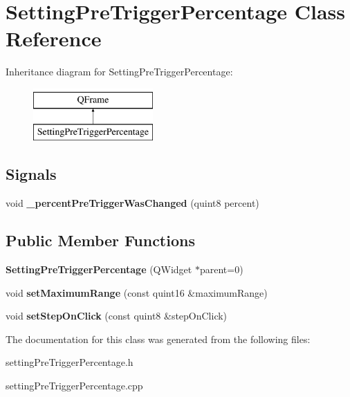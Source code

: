 \hypertarget{class_setting_pre_trigger_percentage}{}\section{Setting\+Pre\+Trigger\+Percentage Class Reference}
\label{class_setting_pre_trigger_percentage}
Inheritance diagram for Setting\+Pre\+Trigger\+Percentage\+:\begin{figure}[H]
\begin{center}
\leavevmode
\includegraphics[height=2.000000cm]{class_setting_pre_trigger_percentage}
\end{center}
\end{figure}
\subsection*{Signals}
\begin{DoxyCompactItemize}
\item 
\mbox{\label{class_setting_pre_trigger_percentage_a882297ce47834168efe05c42c55d47e3}} 
void {\bfseries \+\_\+percent\+Pre\+Trigger\+Was\+Changed} (quint8 percent)
\end{DoxyCompactItemize}
\subsection*{Public Member Functions}
\begin{DoxyCompactItemize}
\item 
\mbox{\label{class_setting_pre_trigger_percentage_a9b703fb0c666fca8f5061fb0a1589cfb}} 
{\bfseries Setting\+Pre\+Trigger\+Percentage} (Q\+Widget $\ast$parent=0)
\item 
\mbox{\label{class_setting_pre_trigger_percentage_a1f9116d87eebc926e9ce2f60c397df89}} 
void {\bfseries set\+Maximum\+Range} (const quint16 \&maximum\+Range)
\item 
\mbox{\label{class_setting_pre_trigger_percentage_a5e12b9aa0e289493cef29c1d4de52277}} 
void {\bfseries set\+Step\+On\+Click} (const quint8 \&step\+On\+Click)
\end{DoxyCompactItemize}


The documentation for this class was generated from the following files\+:\begin{DoxyCompactItemize}
\item 
setting\+Pre\+Trigger\+Percentage.\+h\item 
setting\+Pre\+Trigger\+Percentage.\+cpp\end{DoxyCompactItemize}
